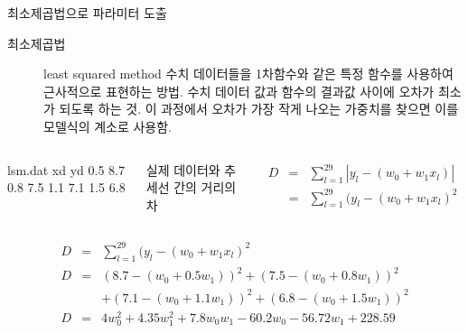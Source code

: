 \documentclass[10pt,t]{beamer}
\begin{document}
\begin{frame} {최소제곱법으로 파라미터 도출}
    \begin{description}
        \item[최소제곱법] least squared method 수치 데이터들을 1차함수와 같은 특정 함수를 사용하여 근사적으로 표현하는 방법. 수치 데이터 값과 함수의 결과값 사이에 오차가 최소가 되도록 하는 것. 이 과정에서 오차가 가장 작게 나오는 가중치를 찾으면 이를 모델식의 계소로 사용함.
    \end{description}


    


\begin{columns}
    \vspace{1em}
\begin{filecontents}{lsm.dat}
    xd yd
    0.5  8.7
    0.8  7.5
    1.1  7.1
    1.5  6.8
\end{filecontents}
    
    \loadedtable
    
    
실제 데이터와 추세선 간의 거리의 차

\begin{eqnarray*}
    D&=& \sum_{l=1} ^{29} |y_l - (w_0 +w_1 x_l)|\\
    &=& \sum_{l=1} ^{29} (y_l - (w_0 +w_1 x_l)^2
\end{eqnarray*}
\end{columns}

\pagebreak
\begin{eqnarray*}
    D &=& \sum_{l=1} ^{29} (y_l - (w_0 +w_1 x_l)^2\\
    D &=& (8.7-(w_0 +0.5w_1))^2 +(7.5-(w_0 +0.8w_1))^2 \\
    &&+ (7.1-(w_0 +1.1w_1))^2 + (6.8-(w_0 +1.5w_1))^2   \\
    D &=& 4w_0^2 + 4.35 w_1^2 +7.8 w_0w_1 -60.2w_0 - 56.72w_1 + 228.59
\end{eqnarray*}


\end{frame}
\end{document}

